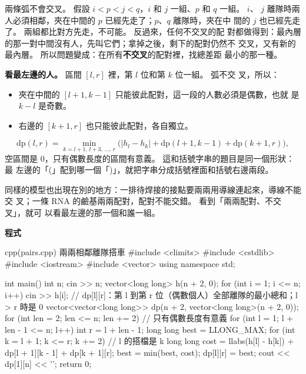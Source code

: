 兩條弧不會交叉。 假設 $i < p < j < q$，$i$ 和 $j$ 一組、$p$ 和 $q$ 一組。 $i$、
$j$ 離隊時兩人必須相鄰，夾在中間的 $p$ 已經先走了；$p$、$q$ 離隊時，夾在中
間的 $j$ 也已經先走了。 兩組都比對方先走，不可能。 反過來，任何不交叉的配
對都做得到：最內層的那一對中間沒有人，先叫它們；拿掉之後，剩下的配對仍然不
交叉，又有新的最內層。 所以問題變成：在所有\textbf{不交叉}的配對裡，找總差距
最小的那一種。

\textbf{看最左邊的人。} 區間 $[l, r]$ 裡，第 $l$ 位和第 $k$ 位一組。 弧不交
叉，所以：

\begin{itemize}
\item 夾在中間的 $[l + 1, k - 1]$ 只能彼此配對，這一段的人數必須是偶數，也就
是 $k - l$ 是奇數。
\item 右邊的 $[k + 1, r]$ 也只能彼此配對，各自獨立。
\end{itemize}

\begin{center}
\end{center}

\[
\mathrm{dp}(l, r) = \min_{k = l + 1,\, l + 3,\, \ldots,\, r} \bigl(|h_l - h_k| + \mathrm{dp}(l + 1, k - 1) + \mathrm{dp}(k + 1, r)\bigr),
\]
空區間是 $0$，只有偶數長度的區間有意義。 這和括號字串的題目是同一個形狀：最
左邊的「(」配到哪一個「)」，就把字串分成括號裡面和括號右邊兩段。

同樣的模型也出現在別的地方：一排待焊接的接點要兩兩用導線連起來，導線不能交
叉；一條 RNA 的鹼基兩兩配對，配對不能交錯。 看到「兩兩配對、不交叉」，就可
以看最左邊的那一個和誰一組。

\textbf{程式}

\begin{example}[label=ex:ivdp-pairs]{cpp}{(pairs.cpp) 兩兩相鄰離隊搭車}
#include <climits>
#include <cstdlib>
#include <iostream>
#include <vector>
using namespace std;

int main() {
    int n;
    cin >> n;
    vector<long long> h(n + 2, 0);
    for (int i = 1; i <= n; i++) {
        cin >> h[i];
    }
    // dp[l][r]：第 l 到第 r 位（偶數個人）全部離隊的最小總和；l > r 時是 0
    vector<vector<long long>> dp(n + 2, vector<long long>(n + 2, 0));
    for (int len = 2; len <= n; len += 2) {   // 只有偶數長度有意義
        for (int l = 1; l + len - 1 <= n; l++) {
            int r = l + len - 1;
            long long best = LLONG_MAX;
            for (int k = l + 1; k <= r; k += 2) {   // l 的搭檔是 k
                long long cost = llabs(h[l] - h[k]) + dp[l + 1][k - 1] + dp[k + 1][r];
                best = min(best, cost);
            }
            dp[l][r] = best;
        }
    }
    cout << dp[1][n] << '\n';
    return 0;
}
\end{example}

